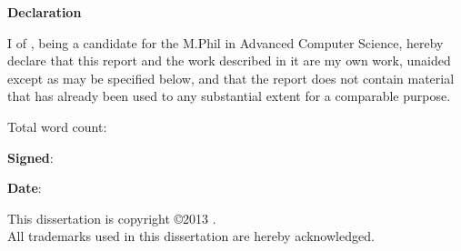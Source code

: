\newpage
{\Huge \bf Declaration}

\vspace{24pt}

I \authorname of \authorcollege, being a candidate for the M.Phil in
Advanced Computer Science, hereby declare that this report and the
work described in it are my own work, unaided except as may be
specified below, and that the report does not contain material that
has already been used to any substantial extent for a comparable
purpose.

\vspace{24pt}
Total word count: \wordcount

\vspace{60pt}
\textbf{Signed}:

\vspace{12pt}
\textbf{Date}:


\vfill

This dissertation is copyright \copyright 2013 \authorname.
\\
All trademarks used in this dissertation are hereby acknowledged.

\newpage
\vspace*{\fill}
